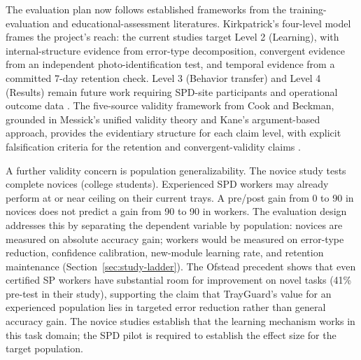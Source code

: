 \documentclass[10pt,a4paper]{article}
\begin{document}
The evaluation plan now follows established frameworks from the training-
evaluation and educational-assessment literatures. Kirkpatrick's four-level
model frames the project's reach: the current studies target Level 2 (Learning),
with internal-structure evidence from error-type decomposition, convergent
evidence from an independent photo-identification test, and temporal evidence
from a committed 7-day retention check. Level 3 (Behavior transfer) and Level 4
(Results) remain future work requiring SPD-site participants and operational
outcome data \cite{kirkpatrick-evaluation-1994}. The five-source validity
framework from Cook and Beckman, grounded in Messick's unified validity theory
and Kane's argument-based approach, provides the evidentiary structure for each
claim level, with explicit falsification criteria for the retention and
convergent-validity claims \cite{messick-validity-1989, kane-validity-2013,
cook-beckman-validity-2006, aera-standards-2014}.

A further validity concern is population generalizability. The novice study
tests complete novices (college students). Experienced SPD workers may already
perform at or near ceiling on their current trays. A pre/post gain from 0 to 90
in novices does not predict a gain from 90 to 90 in workers. The evaluation
design addresses this by separating the dependent variable by population:
novices are measured on absolute accuracy gain; workers would be measured on
error-type reduction, confidence calibration, new-module learning rate, and
retention maintenance (Section~\ref{sec:study-ladder}). The
Ofstead precedent shows that even certified SP workers have substantial room
for improvement on novel tasks (41\% pre-test in their study), supporting the
claim that TrayGuard's value for an experienced population lies in targeted
error reduction rather than general accuracy gain. The novice studies
establish that the learning mechanism works in this task domain; the SPD pilot
is required to establish the effect size for the target population.
\end{document}
